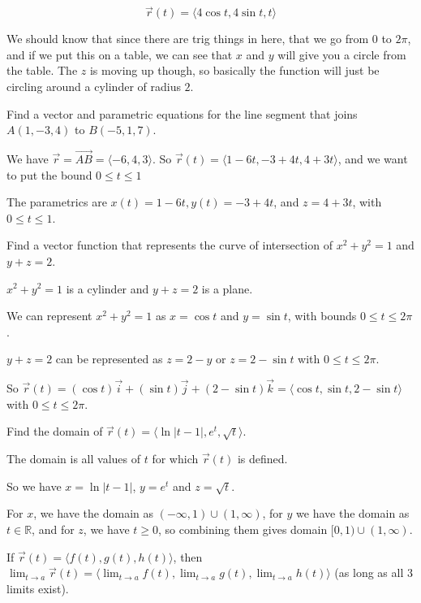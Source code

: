 \documentclass[../calc3.tex]{subfiles}
\begin{document}
\begin{example}
    \[ \vec{r}(t) = \langle 4\cos t, 4\sin t, t\rangle \]

    We should know that since there are trig things in here, that we go from $0$ to $2\pi$, and if we put this on a table, we can see that $x$ and $y$ will give you a circle from the table. The $z$ is moving up though, so basically the function will just be circling around a cylinder of radius $2$.
\end{example}
\pagebreak
\begin{example}
    Find a vector and parametric equations for the line segment that joins $A(1,-3,4)$ to $B(-5,1,7)$.

    We have $\vec{r}=\vec{AB}=\langle -6,4,3\rangle$. So $\vec{r}(t)=\langle 1-6t,-3+4t,4+3t\rangle$, and we want to put the bound $0\leq t\leq 1$

    The parametrics are $x(t)=1-6t, y(t)=-3+4t$, and $z=4+3t$, with $0\leq t\leq 1$.
\end{example}

\begin{example}
    Find a vector function that represents the curve of intersection of $x^2+y^2=1$ and $y+z=2$.

    $x^2+y^2=1$ is a cylinder and $y+z=2$ is a plane.

    We can represent $x^2+y^2=1$ as $x=\cos t$ and $y=\sin t$, with bounds $0\leq t\leq 2\pi$.

    $y+z=2$ can be represented as $z=2-y$ or $z=2-\sin t$ with $0\leq t\leq 2\pi$.

    So $\vec{r}(t)=(\cos t)\vec{i}+(\sin t)\vec{j}+(2-\sin t)\vec{k} = \langle \cos t, \sin t, 2-\sin t\rangle$ with $0\leq t\leq 2\pi$.
\end{example}

\begin{example}
    Find the domain of $\vec{r}(t)=\langle \ln|t-1|, e^t, \sqrt{t}\rangle$.

    The domain is all values of $t$ for which $\vec{r}(t)$ is defined.

    So we have $x=\ln |t-1|$, $y=e^t$ and $z=\sqrt{t}$.

    For $x$, we have the domain as $(-\infty, 1)\cup (1,\infty)$, for $y$ we have the domain as $t\in \mathbb{R}$, and for $z$, we have $t\geq 0$, so combining them gives domain $[0,1)\cup (1,\infty)$.  
\end{example}

\begin{definition}
    If $\vec{r}(t)=\langle f(t),g(t),h(t)\rangle$, then $\lim_{t\to a}\vec{r}(t)=\langle \lim_{t\to a}f(t),\lim_{t\to a}g(t),\lim_{t\to a}h(t)\rangle$ (as long as all 3 limits exist).
\end{definition}
\end{document}
